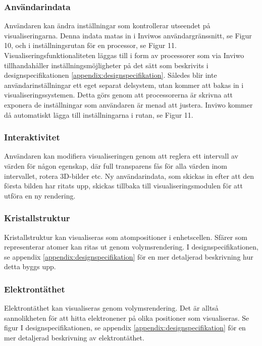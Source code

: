 \documentclass[a4paper,12pt]{article}
\begin{document}
\subsubsection{Användarindata}
Användaren kan ändra inställningar som kontrollerar utseendet på visualiseringarna.
Denna indata matas in i Inviwos användargränssnitt, %
se Figur 10, och i inställningsrutan för en processor, %
se Figur 11.
Visualiseringsfunktionaliteten läggas till i form av processorer som via Inviwo tillhandahåller inställningsmöjligheter på det sätt som beskrivits i designspecifikationen \ref{appendix:designspecifikation}. Således blir inte användarinställningar ett eget separat delsystem, utan kommer att bakas in i visualiseringssystemen. Detta görs genom att processorerna är skrivna att exponera de inställningar som användaren är menad att
justera. Inviwo kommer då automatiskt lägga till inställningarna i rutan, se %
Figur 11.

\subsubsection{Interaktivitet}
Användaren kan modifiera visualiseringen genom att reglera ett intervall av värden för
någon egenskap, där full transparens fås för alla värden inom intervallet, rotera 3D-bilder etc.
Ny användarindata, som skickas in efter att den första bilden har ritats upp, skickas tillbaka till
visualiseringsmodulen för att utföra en ny rendering.

\subsubsection{Kristallstruktur}
Kristallstruktur kan visualiseras som atompositioner i enhetscellen. Sfärer som representerar atomer  kan  ritas  ut  genom  volymsrendering. %
I designspecifikationen, se appendix \ref{appendix:designspecifikation} för en mer detaljerad beskrivning
hur detta byggs upp.

\subsubsection{Elektrontäthet}
Elektrontäthet kan visualiseras genom volymsrendering. Det är alltså sannolikheten för att hitta elektronener på olika positioner som visualiseras. Se figur %
I designspecifikationen, se appendix \ref{appendix:designspecifikation} för en mer detaljerad beskrivning av elektrontäthet.
\end{document}
